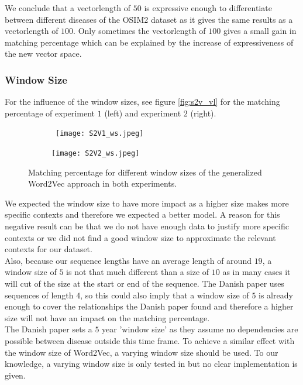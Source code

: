 We conclude that a vectorlength of $50$ is expressive enough to differentiate between different diseases of the OSIM2 dataset as it gives the same results as a vectorlength of $100$. Only sometimes the vectorlength of $100$ gives a small gain in matching percentage which can be explained by the increase of expressiveness of the new vector space.

\subsubsection{Window Size}

For the influence of the window sizes, see figure \ref{fig:s2v_vl} for the matching percentage of experiment $1$ (left) and experiment $2$ (right). \\

\begin{figure}[!htb]
	\centering
	\begin{subfigure}[b]{.49\textwidth}\
		\texttt{[image: S2V1\_ws.jpeg]}
	\end{subfigure}
	\begin{subfigure}[b]{.49\textwidth}
		\texttt{[image: S2V2\_ws.jpeg]}
	\end{subfigure}
	\caption{Matching percentage for different window sizes of the generalized Word2Vec 		approach in both experiments.}
	\label{fig:s2v_ws}
\end{figure}

We expected the window size to have more impact as a higher size makes more specific contexts and therefore we expected a better model. A reason for this negative result can be that we do not have enough data to justify more specific contexts or we did not find a good window size to approximate the relevant contexts for our dataset. \\
Also, because our sequence lengths have an average length of around $19$, a window size of $5$ is not that much different than a size of $10$ as in many cases it will cut of the size at the start or end of the sequence. The Danish paper uses sequences of length $4$, so this could also imply that a window size of $5$ is already enough to cover the relationships the Danish paper found and therefore a higher size will not have an impact on the matching percentage. \\
The Danish paper sets a $5$ year 'window size' as they assume no dependencies are possible between disease outside this time frame. To achieve a similar effect with the window size of Word2Vec, a varying window size should be used. To our knowledge, a varying window size is only tested in \cite{w2vTuning:article} but no clear implementation is given. 

